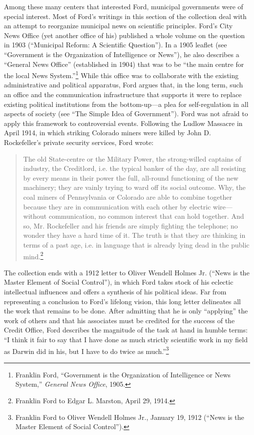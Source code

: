 \documentclass[twoside,symmetric,nobib,justified]{tufte-book}
\begin{document}
Among these many centers that interested Ford, municipal governments
were of special interest. Most of Ford's writings in this section of the
collection deal with an attempt to reorganize municipal news on
scientific principles. Ford's City News Office (yet another office of
his) published a whole volume on the question in 1903 (``Municipal
Reform: A Scientific Question''). In a 1905 leaflet (see ``Government is
the Organization of Intelligence or News''), he also describes a
``General News Office'' (established in 1904) that was to be ``the main
centre for the local News System.''\footnote{Franklin Ford, ``Government
  is the Organization of Intelligence or News System,'' \emph{General
  News Office}, 1905.} While this office was to collaborate with the
existing administrative and political apparatus, Ford argues that, in
the long term, such an office and the communication infrastructure that
supports it were to replace existing political institutions from the
bottom-up---a plea for self-regulation in all aspects of society (see
``The Simple Idea of Government''). Ford was not afraid to apply this
framework to controversial events. Following the Ludlow Massacre in
April 1914, in which striking Colorado miners were killed by John D.
Rockefeller's private security services, Ford wrote:

\begin{quote}
The old State-centre or the Military Power, the strong-willed captains
of industry, the Creditlord, i.e. the typical banker of the day, are all
resisting by every means in their power the full, all-round functioning
of the new machinery; they are vainly trying to ward off its social
outcome. Why, the coal miners of Pennsylvania or Colorado are able to
combine together because they are in communication with each other by
electric wire---without communication, no common interest that can hold
together. And so, Mr. Rockefeller and his friends are simply fighting
the telephone; no wonder they have a hard time of it. The truth is that
they are thinking in terms of a past age, i.e. in language that is
already lying dead in the public mind.\footnote{Franklin Ford to Edgar
  L. Marston, April 29, 1914.}
\end{quote}

The collection ends with a 1912 letter to Oliver Wendell Holmes Jr.
(``News is the Master Element of Social Control''), in which Ford takes
stock of his eclectic intellectual influences and offers a synthesis of
his political ideas. Far from representing a conclusion to Ford's
lifelong vision, this long letter delineates all the work that remains
to be done. After admitting that he is only ``applying'' the work of
others and that his associates must be credited for the success of the
Credit Office, Ford describes the magnitude of the task at hand in
humble terms: ``I think it fair to say that I have done as much strictly
scientific work in my field as Darwin did in his, but I have to do twice
as much.''\footnote{Franklin Ford to Oliver Wendell Holmes Jr., January
  19, 1912 (``News is the Master Element of Social Control'').}
\end{document}
